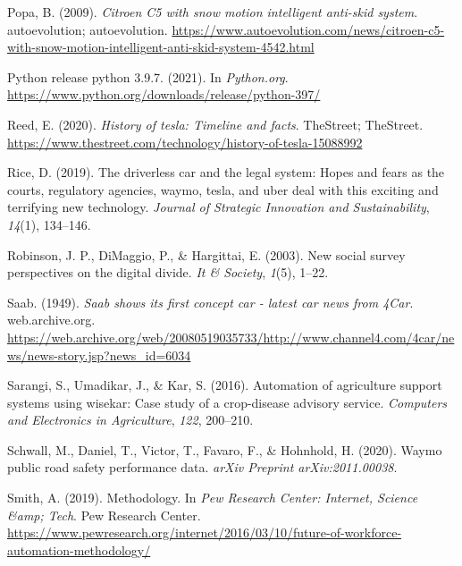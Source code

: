 \documentclass[
  man,floatsintext]{apa7}
\newlength{\cslhangindent}
\newlength{\cslentryspacingunit} %
\newenvironment{CSLReferences}[2] %
 {%
  \setlength{\parindent}{0pt}
  \ifodd #1
  \let\oldpar\par
  \def\par{\hangindent=\cslhangindent\oldpar}
  \fi
  \setlength{\parskip}{#2\cslentryspacingunit}
 }%
 {}
\begin{document}
\begin{CSLReferences}{1}{0}
\leavevmode{}%
Popa, B. (2009). \emph{Citroen C5 with snow motion intelligent anti-skid system}. autoevolution; autoevolution. \url{https://www.autoevolution.com/news/citroen-c5-with-snow-motion-intelligent-anti-skid-system-4542.html}

\leavevmode{}%
Python release python 3.9.7. (2021). In \emph{Python.org}. \url{https://www.python.org/downloads/release/python-397/}

\leavevmode{}%
Reed, E. (2020). \emph{History of tesla: Timeline and facts}. TheStreet; TheStreet. \url{https://www.thestreet.com/technology/history-of-tesla-15088992}

\leavevmode{}%
Rice, D. (2019). The driverless car and the legal system: Hopes and fears as the courts, regulatory agencies, waymo, tesla, and uber deal with this exciting and terrifying new technology. \emph{Journal of Strategic Innovation and Sustainability}, \emph{14}(1), 134--146.

\leavevmode{}%
Robinson, J. P., DiMaggio, P., \& Hargittai, E. (2003). New social survey perspectives on the digital divide. \emph{It \& Society}, \emph{1}(5), 1--22.

\leavevmode{}%
Saab. (1949). \emph{Saab shows its first concept car - latest car news from 4Car}. web.archive.org. \url{https://web.archive.org/web/20080519035733/http://www.channel4.com/4car/news/news-story.jsp?news_id=6034}

\leavevmode{}%
Sarangi, S., Umadikar, J., \& Kar, S. (2016). Automation of agriculture support systems using wisekar: Case study of a crop-disease advisory service. \emph{Computers and Electronics in Agriculture}, \emph{122}, 200--210.

\leavevmode{}%
Schwall, M., Daniel, T., Victor, T., Favaro, F., \& Hohnhold, H. (2020). Waymo public road safety performance data. \emph{arXiv Preprint arXiv:2011.00038}.

\leavevmode{}%
Smith, A. (2019). Methodology. In \emph{Pew Research Center: Internet, Science \&amp; Tech}. Pew Research Center. \url{https://www.pewresearch.org/internet/2016/03/10/future-of-workforce-automation-methodology/}


\end{CSLReferences}
\end{document}
